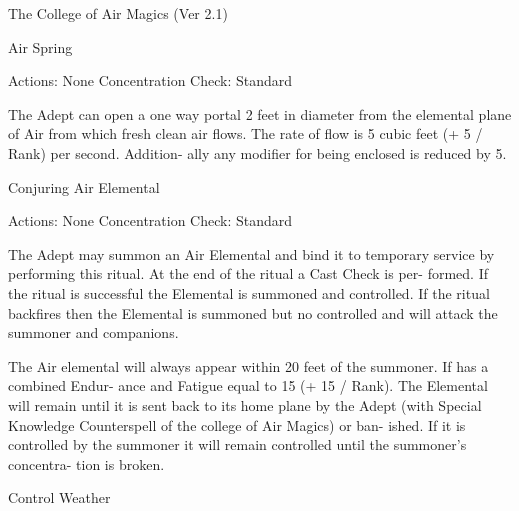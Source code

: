 \begin{Chapter}{The College of Air Magics (Ver 2.1)}
\begin{ritual}[R-1]{Air Spring }

Actions: None 
Concentration Check: Standard 
\begin{effects}
 The  Adept  can  open  a  one  way  portal  2 
feet  in  diameter  from  the  elemental  plane  of  Air 
from which fresh clean air flows. The rate of flow 
is  5  cubic  feet  (+  5  /  Rank)  per  second.  Addition-
ally any modifier for being enclosed is reduced by 
5. 

\end{effects}
\end{ritual}

\begin{ritual}[R-2]{Conjuring Air Elemental }

Actions: None 
Concentration Check: Standard 
\begin{effects}
The Adept may summon an Air Elemental 
and bind it to temporary service by performing this 
ritual. At the end of the ritual a Cast Check is per-
formed.  If  the  ritual  is  successful  the  Elemental  is 
summoned  and  controlled.  If  the  ritual  backfires 
then the Elemental is summoned but no controlled 
and will attack the summoner and companions. 

The  Air  elemental  will  always  appear  within  20 
feet  of  the  summoner.  If  has  a  combined  Endur-
ance  and  Fatigue  equal  to  15  (+  15  /  Rank).  The 
Elemental  will  remain  until  it  is  sent  back  to  its 
home plane by the Adept (with Special Knowledge 
Counterspell of the college of Air Magics) or ban-
ished.  If  it  is  controlled  by  the  summoner  it  will 
remain controlled until the summoner’s concentra-
tion is broken. 


\end{effects}
\end{ritual}

\begin{ritual}[R-3]{Control Weather }



\end{ritual}
\end{Chapter}
